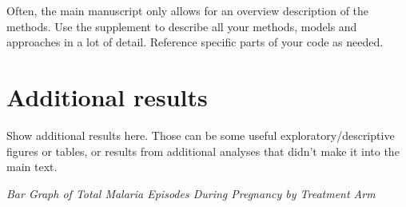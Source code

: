 \documentclass[
  letterpaper,
  DIV=11,
  numbers=noendperiod]{scrartcl}
\begin{document}
Often, the main manuscript only allows for an overview description of
the methods. Use the supplement to describe all your methods, models and
approaches in a lot of detail. Reference specific parts of your code as
needed.

\newpage{}

\section{Additional results}\label{additional-results}

Show additional results here. Those can be some useful
exploratory/descriptive figures or tables, or results from additional
analyses that didn't make it into the main text.

\emph{Bar Graph of Total Malaria Episodes During Pregnancy by Treatment
Arm}
\end{document}
